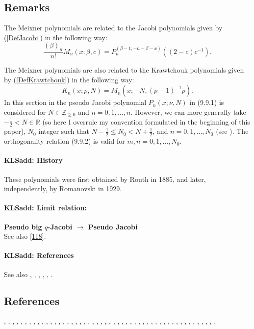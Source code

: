 \documentclass[envcountchap,graybox]{svmono}
\newcommand\RR{\mathbb{R}}
\newcommand\ZZ{\mathbb{Z}}
\newcommand\thalf{\tfrac12}
\begin{document}
\subsection*{Remarks}
The Meixner polynomials are related to the Jacobi polynomials given by (\ref{DefJacobi})
in the following way:
$$\frac{(\beta)_n}{n!}M_n(x;\beta,c)=P_n^{(\beta-1,-n-\beta-x)}((2-c)c^{-1}).$$

\noindent
The Meixner polynomials are also related to the Krawtchouk polynomials given by
(\ref{DefKrawtchouk}) in the following way:
$$K_n(x;p,N)=M_n(x;-N,(p-1)^{-1}p).$$
In this section in  the pseudo Jacobi polynomial $P_n(x;\nu,N)$ in (9.9.1)
is considered
for $N\in\ZZ_{\ge0}$ and $n=0,1,\ldots,n$. However, we can more generally take
$-\thalf<N\in\RR$ (so here I overrule my convention formulated in the
beginning of this paper), $N_0$ integer such that $N-\thalf\le N_0<N+\thalf$, and $n=0,1,\ldots,N_0$
(see ). The orthogonality relation (9.9.2)
is valid for $m,n=0,1,\ldots,N_0$.
%
\paragraph{\large\bf KLSadd: History}These polynomials were first obtained by Routh \cite{K13} in 1885, and later, independently,
by Romanovski  in 1929.
%
\paragraph{\large\bf KLSadd: Limit relation:}{\bf Pseudo big $q$-Jacobi $\longrightarrow$ Pseudo Jacobi}\\
See also \eqref{118}.
%
\paragraph{\large\bf KLSadd: References}See also , ,
, \cite{K11}, \cite{K10}, \cite{K12}.
%
\subsection*{References}
\cite{Allaway76}, \cite{NAlSalam66}, \cite{AlSalam90}, \cite{AlSalamChihara76},
\cite{AlSalamIsmail76}, \cite{Alvarez+}, \cite{AndrewsAskey85}, \cite{Area+II}, \cite{Askey75},
\cite{Askey89I}, \cite{Askey2005}, \cite{AskeyGasper77}, \cite{AskeyIsmail76},
\cite{AskeyWilson85}, \cite{AtakRahmanSuslov}, \cite{AtakSuslov88}, \cite{Bavinck98},
\cite{BavinckHaeringen}, \cite{Campigotto+}, \cite{Chihara78}, \cite{Cooper+},
\cite{Erdelyi+}, \cite{FoataLabelle}, \cite{Gabutti}, \cite{GabuttiMathis}, \cite{Gasper73I},
\cite{Gasper74}, \cite{HoareRahman}, \cite{Ismail2005II}, \cite{IsmailLetVal88},
\cite{IsmailLi}, \cite{IsmailMuldoon}, \cite{IsmailStanton97}, \cite{JinWong},
\cite{Karlin58}, \cite{Koekoek2000}, \cite{Koorn88}, \cite{LabelleYehI}, \cite{LabelleYehII},
\cite{Lesky89}, \cite{Lesky94I}, \cite{Lesky95II}, \cite{LewanowiczII}, \cite{Meixner},
\cite{Nikiforov+}, \cite{NikiforovUvarov}, \cite{Rahman78I}, \cite{ValentAssche},
\cite{Viennot}, \cite{Zarzo+}, \cite{Zeng90}.
\end{document}

